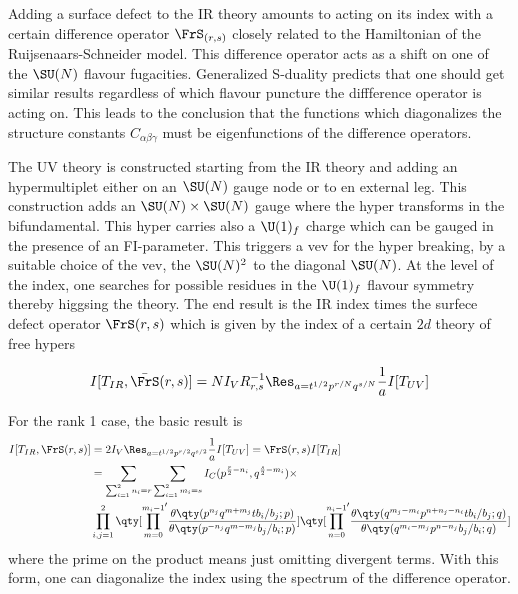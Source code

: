 Adding a surface defect to the IR theory amounts to acting on its index with a certain difference operator $\FrS_{(r,s)}$ closely related to the Hamiltonian of the Ruijsenaars-Schneider model. This difference operator acts as a shift on one of the $\SU(N)$ flavour fugacities. Generalized S-duality predicts that one should get similar results regardless of which flavour puncture the diffference operator is acting on. This leads to the conclusion that the functions which diagonalizes the structure constants $C_{\alpha\beta\gamma}$ must be eigenfunctions of the difference operators.

The UV theory is constructed starting from the IR theory and adding an hypermultiplet either on an $\SU(N)$ gauge node or to en external leg. This construction adds an $\SU(N)\times\SU(N)$ gauge where the hyper transforms in the bifundamental. This hyper carries also a $\U(1)_{f}$ charge which can be gauged in the presence of an FI-parameter. This triggers a vev for the hyper breaking, by a suitable choice of the vev, the $\SU(N)^{2}$ to the diagonal $\SU(N)$. At the level of the index, one searches for possible residues in the $\U(1)_{f}$ flavour symmetry thereby higgsing the theory. The end result is the IR index times the surfece defect operator $\FrS(r,s)$ which is given by the index of a certain $2d$ theory of free hypers

\begin{equation}
	I[T_{IR},\bar{\FrS}(r,s)]=N I_{V} R^{-1}_{r,s} \Res_{a=t^{1/2}p^{r/N}q^{s/N}}\frac{1}{a}I[T_{UV}]
\end{equation}

For the rank 1 case, the basic result is
\begin{equation}
\begin{split}
	I[T_{IR},\FrS(r,s)]&=2 I_{V}\Res_{a=t^{1/2}p^{r/2}q^{s/2}}\frac{1}{a}I[T_{UV}]=\FrS(r,s)I[T_{IR}]\\
	&=\sum_{\sum_{i=1}^{2}n_{i}=r}\sum_{\sum_{i=1}^{2}m_{i}=s}I_{C}(p^{\frac{r}{2}-n_{i}},q^{\frac{s}{2}-m_{i}})\times\\
	&\prod_{i,j=1}^{2}\qty[{\prod_{m=0}^{m_{i}-1}}^{\prime}\frac{\theta\qty(p^{n_{j}}q^{m+m_{j}}tb_{i}/b_{j};p)}{\theta\qty(p^{-n_{j}}q^{m-m_{j}}b_{j}/b_{i};p)}]\qty[{\prod_{n=0}^{n_{i}-1}}^{\prime}\frac{\theta\qty(q^{m_{j}-m_{i}}p^{n+n_{j}-n_{i}}tb_{i}/b_{j};q)}{\theta\qty(q^{m_{i}-m_{j}}p^{n-n_{j}}b_{j}/b_{i};q)}]
\end{split}
\end{equation}
where the prime on the product means just omitting divergent terms. With this form, one can diagonalize the index using the spectrum of the difference operator.

